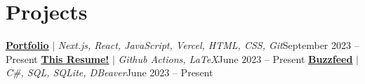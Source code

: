\section{Projects}
\resumeSubHeadingListStart
\resumeProjectHeading
{\textbf{\href{https://jaychen.app}{\underline{Portfolio}}} $|$ \emph{Next.js, React, JavaScript, Vercel, HTML, CSS, Git}}{September 2023 -- Present}
\resumeItemListStart
{}
\resumeItemListEnd
\resumeProjectHeading
{\textbf{\href{https://github.com/jundachen10/jays_resume}{\underline{This Resume!}}} $|$ \emph{Github Actions, LaTeX}}{June 2023 -- Present}
\resumeItemListStart
{}
\resumeItemListEnd
\resumeProjectHeading
{\textbf{\href{https://github.com/jundachen10/buzzfeed}{\underline{Buzzfeed}}} $|$ \emph{C\#, SQL, SQLite, DBeaver}}{June 2023 -- Present}
\resumeItemListStart
{}
\resumeItemListEnd
\resumeSubHeadingListEnd